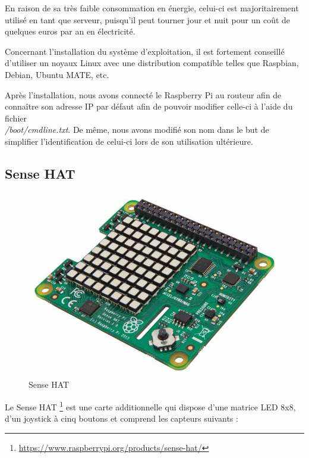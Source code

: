 En raison de sa très faible consommation en énergie, celui-ci est majoritairement
utilisé en tant que serveur, puisqu'il peut tourner jour et nuit pour un coût de
quelques euros par an en électricité.

Concernant l'installation du système d'exploitation, il est fortement conseillé
d'utiliser un noyaux Linux avec une distribution compatible telles que Raspbian,
Debian, Ubuntu MATE, etc.

Après l'installation, nous avons connecté le Raspberry Pi au routeur afin de
connaître son adresse IP par défaut afin de pouvoir modifier celle-ci à l'aide
du fichier \\ \textit{/boot/cmdline.txt}. De même, nous avons modifié son nom
dans le but de simplifier l'identification de celui-ci lors de son utilisation ultérieure.

\newpage

\subsection{Sense HAT}
\label{sec:sense-hat}

\begin{figure}[h]
  \centering
  \includegraphics[scale=0.35]
  {textures/images/presentation/senseHAT.jpg}
  \caption{Sense HAT}
  \label{fig:sense-hat}
\end{figure}

Le Sense HAT \footnote{\url{https://www.raspberrypi.org/products/sense-hat/}}
est une carte additionnelle qui dispose d'une matrice LED 8x8, d'un joystick à cinq
boutons et comprend les capteurs suivants :

